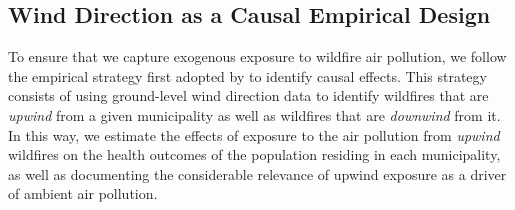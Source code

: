 \documentclass[11pt]{article}
\begin{document}
\begin{spacing}{1.5}
\subsection{Wind Direction as a Causal Empirical Design}
\label{sscn:design}
To ensure that we capture exogenous exposure to wildfire air pollution, we follow the empirical strategy first adopted by \cite{RangelVogl2019} to identify causal effects. This strategy consists of using ground-level wind direction data to identify wildfires that are \textit{upwind} from a given municipality as well as wildfires that are \textit{downwind} from it. In this way, we estimate the effects of exposure to the air pollution from \textit{upwind} wildfires on the health outcomes of the population residing in each municipality, as well as documenting the considerable relevance of upwind exposure as a driver of ambient air pollution.  







\end{spacing}
\end{document}
